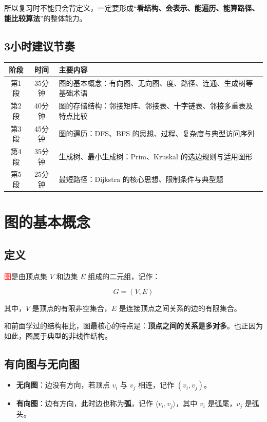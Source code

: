 \documentclass{../../note}
\begin{document}
所以复习时不能只会背定义，一定要形成“\textbf{看结构、会表示、能遍历、能算路径、能比较算法}”的整体能力。

\subsection{3小时建议节奏}

\begin{center}
\begin{tabular}{|c|c|p{9cm}|}
\hline
阶段 & 时间 & 主要内容 \\
\hline
第1段 & 35分钟 & 图的基本概念：有向图、无向图、度、路径、连通、生成树等基础术语 \\
\hline
第2段 & 40分钟 & 图的存储结构：邻接矩阵、邻接表、十字链表、邻接多重表及特点比较 \\
\hline
第3段 & 45分钟 & 图的遍历：DFS、BFS 的思想、过程、复杂度与典型访问序列 \\
\hline
第4段 & 35分钟 & 生成树、最小生成树：Prim、Kruskal 的选边规则与适用图形 \\
\hline
第5段 & 25分钟 & 最短路径：Dijkstra 的核心思想、限制条件与典型题 \\
\hline
\end{tabular}
\end{center}

\section{图的基本概念}

\subsection{定义}

\textcolor{red}{图}是由顶点集 $V$ 和边集 $E$ 组成的二元组，记作：

\[
G = (V, E)
\]

其中，$V$ 是顶点的有限非空集合，$E$ 是连接顶点之间关系的边的有限集合。

和前面学过的结构相比，图最核心的特点是：\textbf{顶点之间的关系是多对多}。也正因为如此，图属于典型的非线性结构。

\subsection{有向图与无向图}

\begin{itemize}
  \item \textbf{无向图}：边没有方向，若顶点 $v_i$ 与 $v_j$ 相连，记作 $(v_i, v_j)$。
  \item \textbf{有向图}：边有方向，此时边也称为\textbf{弧}，记作 $\langle v_i, v_j \rangle$，其中 $v_i$ 是弧尾，$v_j$ 是弧头。
\end{itemize}
\end{document}
